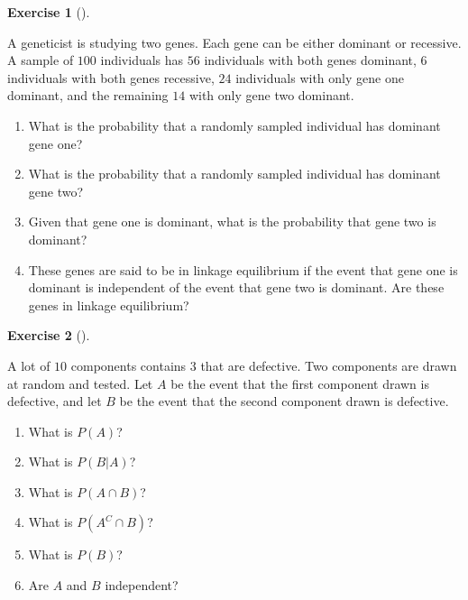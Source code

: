 \documentclass[
  letterpaper,
  DIV=11,
  numbers=noendperiod]{scrreprt}
\providecommand{\tightlist}{%
  \setlength{\itemsep}{0pt}\setlength{\parskip}{0pt}}\usepackage{longtable,booktabs,array}
\theoremstyle{definition}
\theoremstyle{definition}
\newtheorem{exercise}{Exercise}[chapter]
\theoremstyle{definition}
\theoremstyle{remark}
\begin{document}
\begin{exercise}[]\protect\hypertarget{exr-4.7}{}\label{exr-4.7}

A geneticist is studying two genes. Each gene can be either dominant or
recessive. A sample of \(100\) individuals has \(56\) individuals with
both genes dominant, \(6\) individuals with both genes recessive, \(24\)
individuals with only gene one dominant, and the remaining \(14\) with
only gene two dominant.

\begin{enumerate}
\def\labelenumi{\alph{enumi}.}
\tightlist
\item
  What is the probability that a randomly sampled individual has
  dominant gene one?
\item
  What is the probability that a randomly sampled individual has
  dominant gene two?
\item
  Given that gene one is dominant, what is the probability that gene two
  is dominant?
\item
  These genes are said to be in linkage equilibrium if the event that
  gene one is dominant is independent of the event that gene two is
  dominant. Are these genes in linkage equilibrium?
\end{enumerate}

\end{exercise}

\begin{exercise}[]\protect\hypertarget{exr-4.8}{}\label{exr-4.8}

A lot of \(10\) components contains \(3\) that are defective. Two
components are drawn at random and tested. Let \(A\) be the event that
the first component drawn is defective, and let \(B\) be the event that
the second component drawn is defective.

\begin{enumerate}
\def\labelenumi{\alph{enumi}.}
\tightlist
\item
  What is \(P(A)\)?
\item
  What is \(P(B|A)\)?
\item
  What is \(P(A \cap B)\)?
\item
  What is \(P(A^C \cap B)\)?
\item
  What is \(P(B)\)?
\item
  Are \(A\) and \(B\) independent?
\end{enumerate}

\end{exercise}
\end{document}
